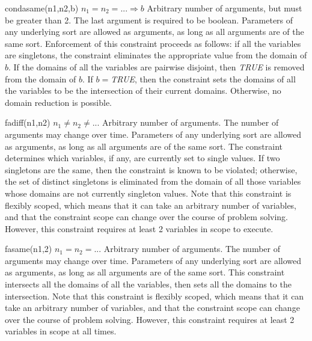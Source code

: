     {condasame(n1,n2,b)}
    {$n_1 = n_2 = ... \Rightarrow b$}
    {Arbitrary number of arguments, but must be greater than 2.  The last argument is required to be boolean.}
    {Parameters of any underlying sort are allowed as arguments, as long as all arguments
    are of the same sort.}
    {Enforcement of this constraint proceeds as follows: if all the variables 
    are singletons, the constraint eliminates the appropriate value from the
    domain of $b$.  If the domains
    of all the variables are pairwise
    disjoint, then {\em TRUE} is removed from the domain of $b$.
    If $b=${\em TRUE}, then
    the constraint sets the domains of all the variables to be the intersection
    of their current domains.  Otherwise, no domain reduction is possible.}

    {fadiff(n1,n2)}
    {$n_1 \neq n_2 \neq ...$}
    {Arbitrary number of arguments.  The number of arguments
    may change over time.}
    {Parameters of any underlying sort are allowed as arguments, as long as all arguments
    are of the same sort.}
    {The constraint determines which variables, if any, are currently set to
    single values.  If two singletons are the same, then the constraint is known to
    be violated; otherwise, the set of
    distinct singletons is eliminated from the domain of all those variables whose
    domains are not currently singleton values.  Note that this constraint is
    flexibly scoped, which means that it can take an arbitrary number of variables,
    and that the constraint scope can change over the course of problem solving.
    However, this constraint requires at least 2 variables in scope to execute.}


    {fasame(n1,2)}
    {$n_1 = n_2 = ...$}
    {Arbitrary number of arguments.  The number of arguments
    may change over time.}
    {Parameters of any underlying sort are allowed as arguments, as long as all arguments
    are of the same sort.}
    {This constraint intersects all the domains
    of all the variables, then sets all the domains to the intersection.
    Note that this constraint is
    flexibly scoped, which means that it can take an arbitrary number of variables,
    and that the constraint scope can change over the course of problem solving.
    However, this constraint requires at least 2 variables in scope at all times.}

